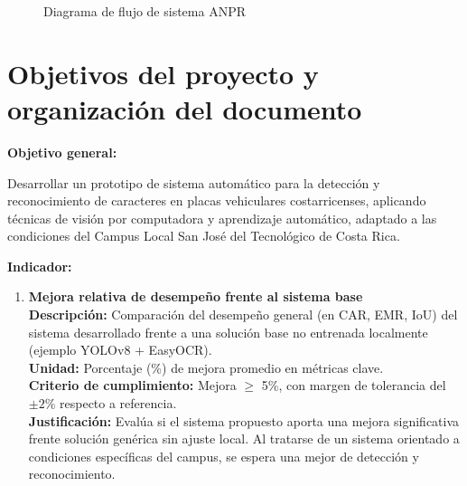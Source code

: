 \begin{figure}[H]
	\centering
	\caption{Diagrama de flujo de sistema ANPR}
\end{figure}

\section{Objetivos del proyecto y organización del documento}

\textbf{Objetivo general: }

Desarrollar un prototipo de 
sistema automático para la detección y reconocimiento de caracteres en placas vehiculares costarricenses,
aplicando técnicas de visión por computadora y aprendizaje automático,
adaptado a las condiciones del Campus Local San José del Tecnológico de Costa Rica.

\textbf{Indicador:}
	\begin{enumerate}
		\item \textbf{Mejora relativa de desempeño frente al sistema base} \\
		\textbf{Descripción:} Comparación del desempeño general (en CAR, EMR, IoU) del sistema
		desarrollado frente a una solución base no entrenada localmente (ejemplo YOLOv8 + EasyOCR). \\
		\textbf{Unidad:} Porcentaje (\%) de mejora promedio en métricas clave. \\
		\textbf{Criterio de cumplimiento:} Mejora $\geq$ 5\%, con margen de tolerancia del $\pm 2$\% respecto a referencia. \\
		\textbf{Justificación:} Evalúa si el sistema propuesto aporta una mejora significativa frente
			solución genérica sin ajuste local. Al tratarse de un sistema orientado a condiciones específicas del campus,
			se espera una mejor de detección y reconocimiento. \\\\
	\end{enumerate}

